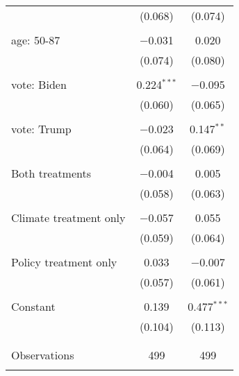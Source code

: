 \begin{tabular}{@{\extracolsep{5pt}}lcc}
  & (0.068) & (0.074) \\ 
  & & \\ 
 age: 50-87 & $-$0.031 & 0.020 \\ 
  & (0.074) & (0.080) \\ 
  & & \\ 
 vote: Biden & 0.224$^{***}$ & $-$0.095 \\ 
  & (0.060) & (0.065) \\ 
  & & \\ 
 vote: Trump & $-$0.023 & 0.147$^{**}$ \\ 
  & (0.064) & (0.069) \\ 
  & & \\ 
 Both treatments & $-$0.004 & 0.005 \\ 
  & (0.058) & (0.063) \\ 
  & & \\ 
 Climate treatment only & $-$0.057 & 0.055 \\ 
  & (0.059) & (0.064) \\ 
  & & \\ 
 Policy treatment only & 0.033 & $-$0.007 \\ 
  & (0.057) & (0.061) \\ 
  & & \\ 
 Constant & 0.139 & 0.477$^{***}$ \\ 
  & (0.104) & (0.113) \\ 
  & & \\ 
\hline \\[-1.8ex] 

Observations & 499 & 499 \\ 
\hline 
\hline \\[-1.8ex] 
\end{tabular} 